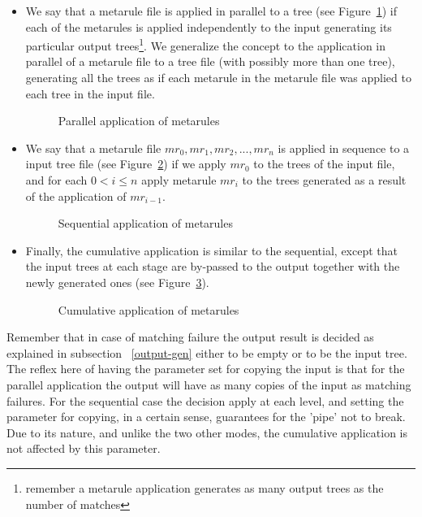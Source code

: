 \begin{itemize}
\item We say that a metarule file is applied in parallel to a tree 
(see Figure~\ref{parallel})
if each of the 
metarules is applied independently to the input generating its particular 
output trees\footnote{remember a metarule application generates as many 
output trees as the number of matches}. We generalize the concept to the
application in parallel of a metarule file to a tree file (with possibly more 
than one tree), generating all the trees
as if each metarule in the metarule file was applied to each tree in the
input file.

\begin{figure}[htb]
\centerline{}
\caption{Parallel application of metarules}
\label{parallel}
\end{figure}

\item We say that a metarule file $mr_0, mr_1, mr_2, ...,mr_n$ is applied in 
sequence to a input tree file 
(see Figure~\ref{sequential})
if we apply $mr_0$ to the trees of the input file, and
for each $0<i\leq n$ apply metarule $mr_i$ to the trees generated as a 
result of the application of $mr_{i-1}$.

\begin{figure}[htb]
\centerline{}
\caption{Sequential application of metarules}
\label{sequential}
\end{figure}

\item Finally, the cumulative application is similar to the sequential, 
except that the input trees at each stage are by-passed to the output together
with the newly generated ones (see Figure~\ref{cumulative}).

\begin{figure}[htb]
\centerline{}
\caption{Cumulative application of metarules}
\label{cumulative}
\end{figure}

\end{itemize}

Remember that in case of matching failure the output result is decided as 
explained in subsection ~\ref{output-gen} either to be empty or to be the 
input tree. The reflex here of having the parameter set for copying the input
is that for the parallel application the output will have as many copies of
the input as matching failures. For the sequential case the decision apply
at each level, and setting the parameter for copying, in a certain sense, 
guarantees for the 'pipe' not to break.
Due to its nature, and unlike the two other modes, the cumulative 
application is not affected by this parameter.


